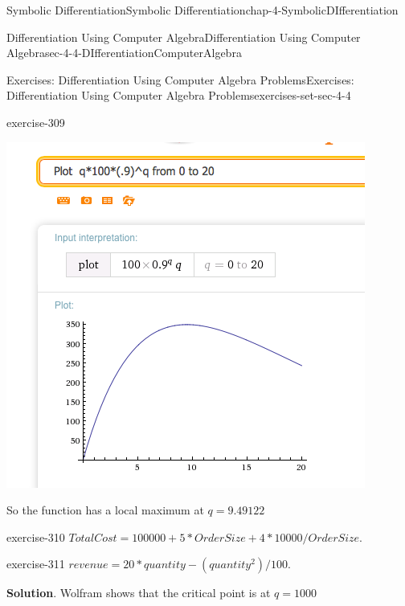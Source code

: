 \documentclass[oneside,10pt,]{book}
\numberwithin{equation}{section}
\begin{document}
\begin{chapterptx}{Symbolic Differentiation}{}{Symbolic Differentiation}{}{}{chap-4-SymbolicDIfferentiation}
\begin{sectionptx}{Differentiation Using Computer Algebra}{}{Differentiation Using Computer Algebra}{}{}{sec-4-4-DIfferentiationComputerAlgebra}
\begin{exercises-subsection-numberless}{Exercises: Differentiation Using Computer Algebra Problems}{}{Exercises: Differentiation Using Computer Algebra Problems}{}{}{exercises-set-sec-4-4}
\begin{divisionexercise}{21}{}{}{exercise-309}
\begin{sidebyside}{1}{0.25}{0.25}{0}
\begin{sbspanel}{0.5}
\includegraphics[width=1\linewidth]{images/sec4-4-sol21b.png}
\end{sbspanel}%
\end{sidebyside}%
\par
\hypertarget{p-1775}{}%
So the function has a local maximum at \(q = 9.49122\)%
\end{divisionexercise}%
\begin{divisionexercise}{22}{}{}{exercise-310}%
\hypertarget{p-1776}{}%
\(TotalCost=100000+5*OrderSize+4*10000/OrderSize\).%
\end{divisionexercise}%
\begin{divisionexercise}{23}{}{}{exercise-311}%
\hypertarget{p-1777}{}%
\(revenue=20*quantity-(quantity^2)/100\).%
\par\smallskip%
\noindent\textbf{Solution}.\hypertarget{solution-155}{}\quad%
\hypertarget{p-1778}{}%
Wolfram shows that the critical point is at \(q = 1000\)%
\begin{sidebyside}{1}{0.3}{0.3}{0}%
\begin{sbspanel}{0.4}%

\end{sbspanel}
\end{sidebyside}
\end{divisionexercise}
\end{exercises-subsection-numberless}
\end{sectionptx}
\end{chapterptx}
\end{document}
